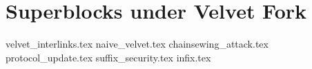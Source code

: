 \chapter{Superblocks under Velvet Fork}

{velvet_interlinks.tex}
{naive_velvet.tex}
{chainsewing_attack.tex}
{protocol_update.tex}
{suffix_security.tex}
{infix.tex}